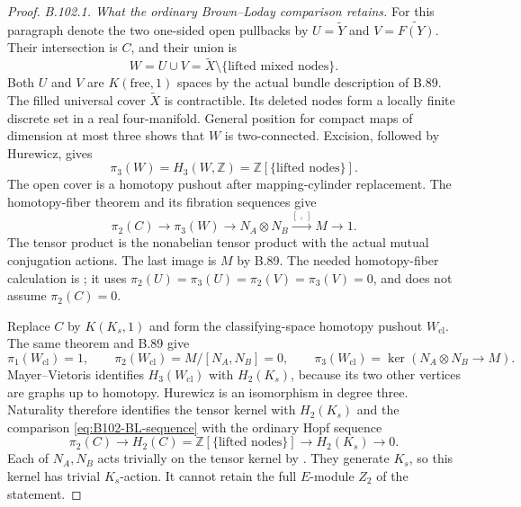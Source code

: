 \begin{proof}
\emph{B.102.1. What the ordinary Brown--Loday comparison retains.}
For this paragraph denote the two one-sided open pullbacks by
$U=\widetilde Y$ and $V=\widetilde{F(Y)}$. Their intersection is $C$,
and their union is
\[
 W=U\cup V=\widetilde X\setminus\{\text{lifted mixed nodes}\}.
\]
Both $U$ and $V$ are $K(\text{free},1)$ spaces by the actual bundle
description of B.89. The filled universal cover $\widetilde X$ is
contractible. Its deleted nodes form a locally finite discrete set
in a real four-manifold. General position for compact maps of
dimension at most three shows that $W$ is two-connected. Excision,
followed by Hurewicz, gives
\begin{equation}\label{eq:B102-node-spheres}
 \pi_3(W)=H_3(W,\mathbb Z)
        =\mathbb Z[\{\text{lifted nodes}\}].
\end{equation}
The open cover is a homotopy pushout after mapping-cylinder
replacement. The homotopy-fiber theorem and its fibration sequences
give
\begin{equation}\label{eq:B102-BL-sequence}
 \pi_2(C)\longrightarrow\pi_3(W)
  \longrightarrow N_A\otimes N_B
  \xrightarrow{[\ ,\ ]}M\longrightarrow1.
\end{equation}
The tensor product is the nonabelian tensor product with the actual
mutual conjugation actions. The last image is $M$ by B.89.
The needed homotopy-fiber calculation is
\citet[Theorem~3.1 and Corollaries~3.2--3.4, pp.~318--319]{BBrownLoday1987};
it uses $\pi_2(U)=\pi_3(U)=\pi_2(V)=\pi_3(V)=0$, and does not
assume $\pi_2(C)=0$.

Replace $C$ by $K(K_s,1)$ and form the classifying-space homotopy
pushout $W_{\mathrm{cl}}$. The same theorem and B.89 give
\[
 \pi_1(W_{\mathrm{cl}})=1,\qquad
 \pi_2(W_{\mathrm{cl}})=M/[N_A,N_B]=0,\qquad
 \pi_3(W_{\mathrm{cl}})=\ker(N_A\otimes N_B\to M).
\]
Mayer--Vietoris identifies $H_3(W_{\mathrm{cl}})$ with $H_2(K_s)$,
because its two other vertices are graphs up to homotopy.
Hurewicz is an isomorphism in degree three. Naturality therefore
identifies the tensor kernel with $H_2(K_s)$ and the comparison
\eqref{eq:B102-BL-sequence} with the ordinary Hopf sequence
\begin{equation}\label{eq:B102-ordinary-Hopf}
 \pi_2(C)\longrightarrow H_2(C)
     =\mathbb Z[\{\text{lifted nodes}\}]
     \longrightarrow H_2(K_s)\longrightarrow0.
\end{equation}
Each of $N_A,N_B$ acts trivially on the tensor kernel by
\citet[Proposition~2.3(e), pp.~314--315]{BBrownLoday1987}.
They generate $K_s$, so this kernel has trivial $K_s$-action.
It cannot retain the full $E$-module $Z_2$ of the statement.


\end{proof}
